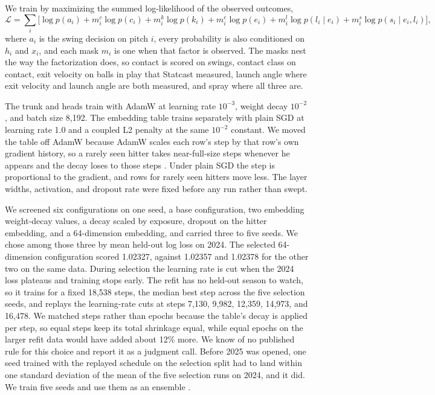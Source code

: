 \documentclass[11pt,letterpaper]{article}
\begin{document}
We train by maximizing the summed log-likelihood of the observed outcomes,
\begin{equation}
\mathcal{L} = \sum_{i} \Big[ \log p(a_i) + m^{c}_i \log p(c_i) + m^{k}_i \log p(k_i) + m^{e}_i \log p(e_i) + m^{l}_i \log p(l_i \mid e_i) + m^{s}_i \log p(s_i \mid e_i, l_i) \Big],
\label{eq:loss}
\end{equation}
where $a_i$ is the swing decision on pitch $i$, every probability is also conditioned on $h_i$ and $x_i$, and each mask $m_i$ is one when that factor is observed. The masks nest the way the factorization does, so contact is scored on swings, contact class on contact, exit velocity on balls in play that Statcast measured, launch angle where exit velocity and launch angle are both measured, and spray where all three are.

The trunk and heads train with AdamW \citep{loshchilov2019} at learning rate $10^{-3}$, weight decay $10^{-2}$, and batch size 8,192. The embedding table trains separately with plain SGD at learning rate 1.0 and a coupled L2 penalty at the same $10^{-2}$ constant. We moved the table off AdamW because AdamW scales each row's step by that row's own gradient history, so a rarely seen hitter takes near-full-size steps whenever he appears and the decay loses to those steps \citep{stollenwerk2025}. Under plain SGD the step is proportional to the gradient, and rows for rarely seen hitters move less. The layer widths, activation, and dropout rate were fixed before any run rather than swept.

We screened six configurations on one seed, a base configuration, two embedding weight-decay values, a decay scaled by exposure, dropout on the hitter embedding, and a 64-dimension embedding, and carried three to five seeds. We chose among those three by mean held-out log loss on 2024. The selected 64-dimension configuration scored 1.02327, against 1.02357 and 1.02378 for the other two on the same data. During selection the learning rate is cut when the 2024 loss plateaus and training stops early. The refit has no held-out season to watch, so it trains for a fixed 18,538 steps, the median best step across the five selection seeds, and replays the learning-rate cuts at steps 7,130, 9,982, 12,359, 14,973, and 16,478. We matched steps rather than epochs because the table's decay is applied per step, so equal steps keep its total shrinkage equal, while equal epochs on the larger refit data would have added about 12\% more. We know of no published rule for this choice and report it as a judgment call. Before 2025 was opened, one seed trained with the replayed schedule on the selection split had to land within one standard deviation of the mean of the five selection runs on 2024, and it did. We train five seeds and use them as an ensemble \citep{lakshminarayanan2017}.
\end{document}
